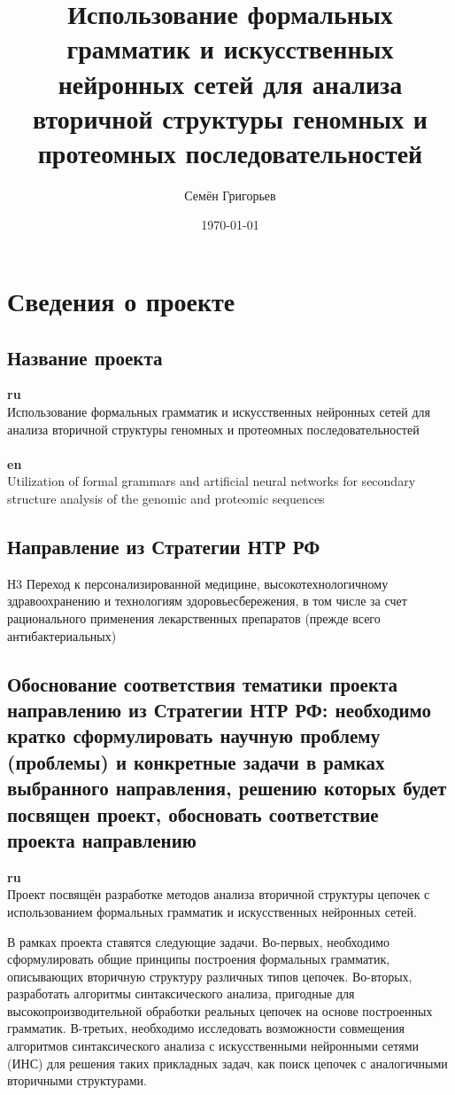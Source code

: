 \documentclass[12pt]{article}  %
\title{Использование формальных грамматик и искусственных нейронных сетей для анализа вторичной структуры геномных и протеомных  последовательностей}
\author{Семён Григорьев}
\date{\today}
\theoremstyle{remark}
\begin{document}

\maketitle

\section{Сведения о проекте}

\subsection{Название проекта}

\textbf{ru}\\
Использование формальных грамматик и искусственных нейронных сетей для анализа вторичной структуры геномных и протеомных  последовательностей
\\
\\
\textbf{en}\\
Utilization of formal grammars and artificial neural networks for secondary structure analysis of the genomic and proteomic sequences

\subsection{Направление из Стратегии НТР РФ}
Н3 Переход к персонализированной медицине, высокотехнологичному здравоохранению и технологиям здоровьесбережения, в том числе за счет рационального применения лекарственных препаратов (прежде всего антибактериальных)

\subsection{Обоснование соответствия тематики проекта направлению из Стратегии НТР РФ: необходимо кратко сформулировать научную проблему (проблемы) и конкретные задачи в рамках выбранного направления, решению которых будет посвящен проект, обосновать соответствие проекта направлению}
\textbf{ru}\\
Проект посвящён разработке методов анализа вторичной структуры цепочек с использованием формальных грамматик и искусственных нейронных сетей.

В рамках проекта ставятся следующие задачи.
Во-первых, необходимо сформулировать общие принципы построения формальных грамматик, описывающих вторичную структуру различных типов цепочек.
Во-вторых, разработать алгоритмы синтаксического анализа, пригодные для высокопроизводительной обработки реальных цепочек на основе построенных грамматик.
В-третьих, необходимо исследовать возможности совмещения алгоритмов синтаксического анализа с искусственными нейронными сетями (ИНС) для решения таких прикладных задач, как поиск цепочек с аналогичными вторичными структурами.
\end{document}
